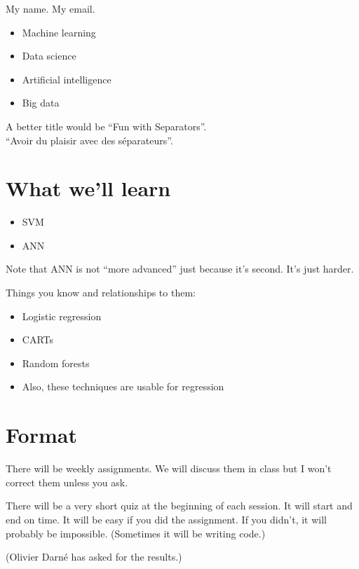




My name.  My email.

\begin{itemize}
\item Machine learning
\item Data science
\item Artificial intelligence
\item Big data
\end{itemize}

A better title would be ``Fun with Separators''.\\
``Avoir du plaisir avec des séparateurs''.

\section*{What we'll learn}

\begin{itemize}
\item SVM
\item ANN
\end{itemize}

Note that ANN is not ``more advanced'' just because it's second.  It's
just harder.

Things you know and relationships to them:
\begin{itemize}
\item Logistic regression
\item CARTs
\item Random forests
\item Also, these techniques are usable for regression
\end{itemize}


\section*{Format}

There will be weekly assignments.  We will discuss them in class but I
won't correct them unless you ask.

There will be a very short quiz at the beginning of each session.  It
will start and end on time.  It will be easy if you did the
assignment.  If you didn't, it will probably be impossible.
(Sometimes it will be writing code.)

(Olivier Darné has asked for the results.)

